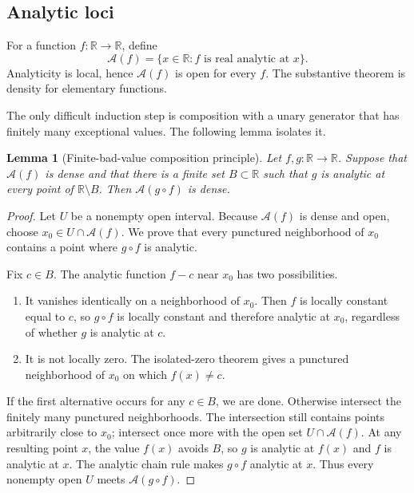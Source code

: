 \documentclass[11pt,oneside]{article}
\newtheorem{lemma}[theorem]{Lemma}
\theoremstyle{definition}
\theoremstyle{remark}
\newcommand{\R}{\mathbb R}
\newcommand{\anloc}{\mathcal A}
\begin{document}
\subsection{Analytic loci}

For a function $f:\R\to\R$, define
\begin{equation}
 \anloc(f)=\{x\in\R:f\text{ is real analytic at }x\}.
 \label{eq:analytic-locus}
\end{equation}
Analyticity is local, hence $\anloc(f)$ is open for every $f$.  The substantive theorem is
density for elementary functions.

The only difficult induction step is composition with a unary generator that has finitely
many exceptional values.  The following lemma isolates it.

\begin{lemma}[Finite-bad-value composition principle]
\label{lem:finite-bad-composition}
Let $f,g:\R\to\R$.  Suppose that $\anloc(f)$ is dense and that there is a finite set
$B\subset\R$ such that $g$ is analytic at every point of $\R\setminus B$.  Then
$\anloc(g\circ f)$ is dense.
\end{lemma}

\begin{proof}
Let $U$ be a nonempty open interval.  Because $\anloc(f)$ is dense and open, choose
$x_0\in U\cap\anloc(f)$.  We prove that every punctured neighborhood of $x_0$ contains a
point where $g\circ f$ is analytic.

Fix $c\in B$.  The analytic function $f-c$ near $x_0$ has two possibilities.
\begin{enumerate}
 \item It vanishes identically on a neighborhood of $x_0$.  Then $f$ is locally constant
 equal to $c$, so $g\circ f$ is locally constant and therefore analytic at $x_0$, regardless
 of whether $g$ is analytic at $c$.
 \item It is not locally zero.  The isolated-zero theorem gives a punctured neighborhood of
 $x_0$ on which $f(x)\ne c$.
\end{enumerate}
If the first alternative occurs for any $c\in B$, we are done.  Otherwise intersect the
finitely many punctured neighborhoods.  The intersection still contains points arbitrarily
close to $x_0$; intersect once more with the open set $U\cap\anloc(f)$.  At any resulting
point $x$, the value $f(x)$ avoids $B$, so $g$ is analytic at $f(x)$ and $f$ is analytic at
$x$.  The analytic chain rule makes $g\circ f$ analytic at $x$.  Thus every nonempty open
$U$ meets $\anloc(g\circ f)$.
\end{proof}
\end{document}
